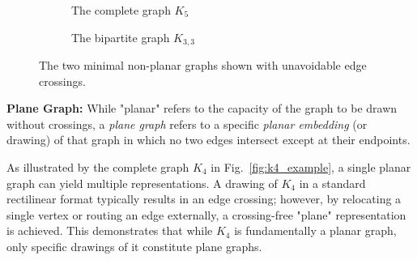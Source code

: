 \documentclass[conference]{IEEEtran}
\begin{document}
\begin{figure}[h]
\centering
\begin{subfigure}[t]{0.45\linewidth}
\centering
{}
\caption{The complete graph $K_5$}
\end{subfigure}
\hfill
\begin{subfigure}[t]{0.45\linewidth}
\centering
{}
\caption{The bipartite graph $K_{3,3}$}
\end{subfigure}
\caption{The two minimal non-planar graphs shown with unavoidable edge crossings.}
\label{fig:nonplanar}
\end{figure}

\textbf{Plane Graph:} While "planar" refers to the capacity of the graph to be drawn without crossings, a \textit{plane graph} refers to a specific \textit{planar embedding} (or drawing) of that graph in which no two edges intersect except at their endpoints. 

As illustrated by the complete graph $K_4$ in Fig.~\ref{fig:k4_example}, a single planar graph can yield multiple representations. A drawing of $K_4$ in a standard rectilinear format typically results in an edge crossing; however, by relocating a single vertex or routing an edge externally, a crossing-free "plane" representation is achieved. This demonstrates that while $K_4$ is fundamentally a planar graph, only specific drawings of it constitute plane graphs.
\end{document}
